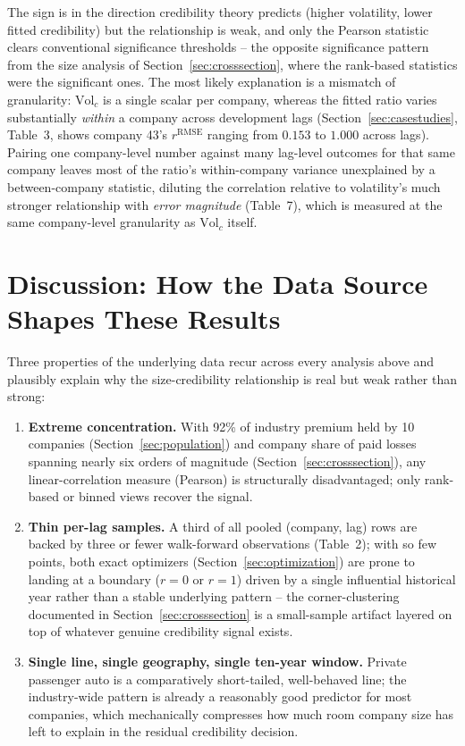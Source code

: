 \documentclass[11pt]{article}
\newcommand{\rrmse}{r^{\text{RMSE}}}
\begin{document}
The sign is in the direction credibility theory predicts (higher volatility, lower fitted
credibility) but the relationship is weak, and only the Pearson statistic clears conventional
significance thresholds -- the opposite significance pattern from the size analysis of
Section~\ref{sec:crosssection}, where the rank-based statistics were the significant ones. The
most likely explanation is a mismatch of granularity: $\text{Vol}_c$ is a single scalar per
company, whereas the fitted ratio varies substantially \emph{within} a company across development
lags (Section~\ref{sec:casestudies}, Table~3, shows company 43's $\rrmse$ ranging from $0.153$ to
$1.000$ across lags). Pairing one company-level number against many lag-level outcomes for that
same company leaves most of the ratio's within-company variance unexplained by a between-company
statistic, diluting the correlation relative to volatility's much stronger relationship with
\emph{error magnitude} (Table~7), which is measured at the same company-level granularity as
$\text{Vol}_c$ itself.

\section{Discussion: How the Data Source Shapes These Results}
\label{sec:discussion}

Three properties of the underlying data recur across every analysis above and plausibly explain
why the size-credibility relationship is real but weak rather than strong:

\begin{enumerate}
\item \textbf{Extreme concentration.} With 92\% of industry premium held by 10 companies
  (Section~\ref{sec:population}) and company share of paid losses spanning nearly six orders of
  magnitude (Section~\ref{sec:crosssection}), any linear-correlation measure (Pearson) is
  structurally disadvantaged; only rank-based or binned views recover the signal.
\item \textbf{Thin per-lag samples.} A third of all pooled (company, lag) rows are backed by three
  or fewer walk-forward observations (Table~2); with so few points, both exact optimizers
  (Section~\ref{sec:optimization}) are prone to landing at a boundary ($r=0$ or $r=1$) driven by a
  single influential historical year rather than a stable underlying pattern -- the corner-clustering
  documented in Section~\ref{sec:crosssection} is a small-sample artifact layered on top of
  whatever genuine credibility signal exists.
\item \textbf{Single line, single geography, single ten-year window.} Private passenger auto is a
  comparatively short-tailed, well-behaved line; the industry-wide pattern is already a reasonably
  good predictor for most companies, which mechanically compresses how much room company size has
  left to explain in the residual credibility decision.
\end{enumerate}
\end{document}
